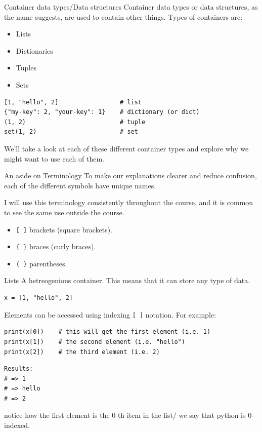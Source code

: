 \documentclass[10pt]{beamer}
\begin{document}
\begin{frame}[label={sec:orgcc90097},fragile]{Container data types/Data structures}
 Container data types or data structures, as the name suggests, are used to contain
other things. Types of containers are:

\begin{itemize}
\item Lists
\item Dictionaries
\item Tuples
\item Sets
\end{itemize}

\begin{verbatim}
[1, "hello", 2]                 # list
{"my-key": 2, "your-key": 1}    # dictionary (or dict)
(1, 2)                          # tuple
set(1, 2)                       # set
\end{verbatim}

We'll take a look at each of these different container types and explore why we
might want to use each of them.
\end{frame}

\begin{frame}[label={sec:org4008da6},fragile]{An aside on Terminology}
 To make our explanations clearer and reduce confusion, each of the different symbols
have unique names.

I will use this terminology consistently throughout the course, and it is common to
see the same use outside the course.

\begin{itemize}
\item \texttt{[ ]} brackets (square brackets).
\item \texttt{\{ \}} braces (curly braces).
\item \texttt{( )} parentheses.
\end{itemize}
\end{frame}

\begin{frame}[label={sec:org9bf5721},fragile]{Lists}
 A hetreogenious container. This means that it can store any type of data.

\begin{verbatim}
x = [1, "hello", 2]
\end{verbatim}

Elements can be accessed using indexing \texttt{[ ]} notation. For example:

\begin{verbatim}
print(x[0])    # this will get the first element (i.e. 1)
print(x[1])    # the second element (i.e. "hello")
print(x[2])    # the third element (i.e. 2)
\end{verbatim}

\begin{verbatim}
Results: 
# => 1
# => hello
# => 2
\end{verbatim}


\alert{notice how the first element is the 0-th item in the list/} we say that python is
0-indexed.
\end{frame}
\end{document}
